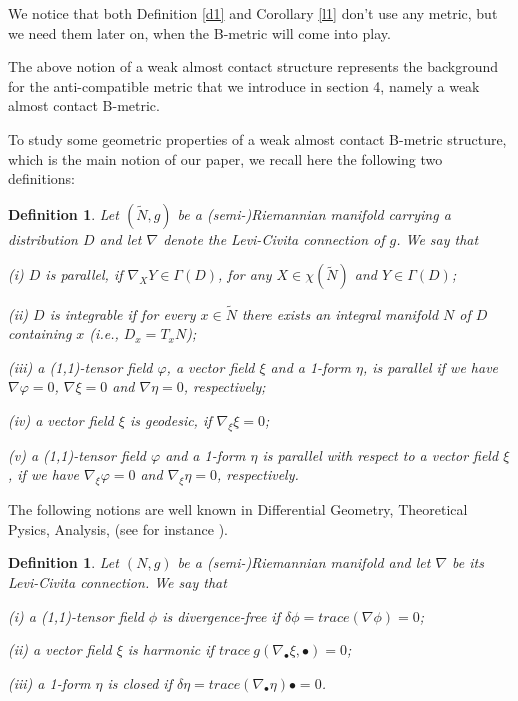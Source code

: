 \documentclass{article}
\newtheorem{definition}[theorem]{Definition}
\begin{document}
\noindent We notice that both Definition \ref{d1} and Corollary \ref{l1} don't use any metric, but we need them later on, when the B-metric will come into play.

\noindent The above notion of a weak almost contact structure represents the background  for the anti-compatible metric that we introduce in section 4, namely a weak almost contact B-metric.\medskip

\noindent To study some geometric properties of a weak almost contact B-metric structure, which is the main notion of our paper, we recall here the following two definitions:

\begin{definition}  \label{d5}
	Let $(\widetilde{N},g)$ be a (semi-)Riemannian manifold carrying a distribution $D$ and let $\nabla$ denote the Levi-Civita connection of $g$. We say that
	\medskip
	
	\noindent (i) $D$ is parallel, if $\nabla_XY\in\Gamma(D)$, for any $X\in\chi(\widetilde{N})$ and $Y\in \Gamma(D)$;\medskip
	
	\noindent (ii) $D$ is integrable if for every $x\in \widetilde{N}$ there exists an integral manifold $N$ of $D$ containing $x$ (i.e.,  $D_x=T_xN$);\medskip
	
	\noindent (iii)  a (1,1)-tensor field $\varphi$, a vector field $\xi$ and a 1-form $\eta$, is parallel if we have $\nabla\varphi=0$, $\nabla \xi=0$ and $\nabla\eta=0$, respectively; \medskip
	
	\noindent (iv) a vector field $\xi$ is geodesic, if $\nabla_{\xi}\xi=0$;\medskip
	
	\noindent (v) a (1,1)-tensor field $\varphi$ and a 1-form $\eta$ is parallel with respect to a vector field $\xi$, if we have $\nabla_{\xi}\varphi=0$ and $\nabla_{\xi}\eta=0$, respectively.
\end{definition}

\noindent The following notions are well known in Differential Geometry, Theoretical Pysics, Analysis, (see for instance \cite{Baird}). 

\begin{definition}  \label{dd5}
	Let $(N,g)$ be a (semi-)Riemannian manifold and let $\nabla$ be its Levi-Civita connection. We say that
	\medskip
	
	\noindent (i)  a (1,1)-tensor field $\phi$ is divergence-free if $\delta\phi=trace(\nabla\phi)=0$;\medskip
	
	\noindent (ii) a vector field $\xi$ is harmonic if $trace \ g(\nabla_{\bullet} \xi,\bullet)=0$;\medskip
	
	\noindent (iii) a 1-form $\eta$ is closed if $\delta\eta=trace(\nabla_{\bullet}\eta)\bullet=0$.
	
\end{definition}
\end{document}
